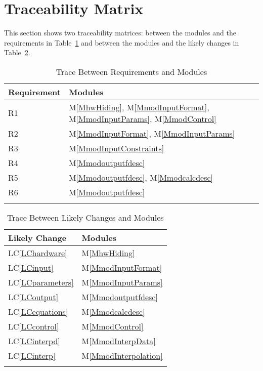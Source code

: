 \documentclass[12pt]{article}
\begin{document}
\section{Traceability Matrix}
\label{Sec:TM}
This section shows two traceability matrices: between the modules and the requirements in Table~\ref{Table:TBRaM} and between the modules and the likely changes in Table~\ref{Table:TBLCaM}.
\begin{longtable}{l l}
\toprule
Requirement & Modules
\\
\midrule
R1 & M\ref{MhwHiding}, M\ref{MmodInputFormat}, M\ref{MmodInputParams}, M\ref{MmodControl}
\\
R2 & M\ref{MmodInputFormat}, M\ref{MmodInputParams}
\\
R3 & M\ref{MmodInputConstraints}
\\
R4 & M\ref{Mmodoutputfdesc}
\\
R5 & M\ref{Mmodoutputfdesc}, M\ref{Mmodcalcdesc}
\\
R6 & M\ref{Mmodoutputfdesc}
\\
\bottomrule
\caption{Trace Between Requirements and Modules}
\label{Table:TBRaM}
\end{longtable}
\begin{longtable}{l l}
\toprule
Likely Change & Modules
\\
\midrule
LC\ref{LChardware} & M\ref{MhwHiding}
\\
LC\ref{LCinput} & M\ref{MmodInputFormat}
\\
LC\ref{LCparameters} & M\ref{MmodInputParams}
\\
LC\ref{LCoutput} & M\ref{Mmodoutputfdesc}
\\
LC\ref{LCequations} & M\ref{Mmodcalcdesc}
\\
LC\ref{LCcontrol} & M\ref{MmodControl}
\\
LC\ref{LCinterpd} & M\ref{MmodInterpData}
\\
LC\ref{LCinterp} & M\ref{MmodInterpolation}
\\
\bottomrule
\caption{Trace Between Likely Changes and Modules}
\label{Table:TBLCaM}
\end{longtable}
\end{document}
